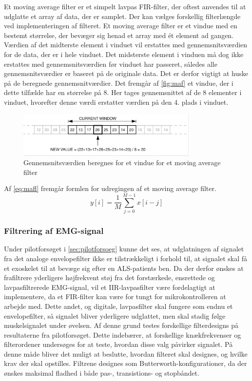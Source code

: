 \vspace{3mm}
\noindent
Et moving average filter er et simpelt lavpas FIR-filter, der oftest anvendes til at udglatte et array af data, der er samplet. Der kan vælges forskellig filterlængde ved implementeringen af filteret. Et moving average filter er et vindue med en bestemt størrelse, der bevæger sig henad et array med ét element ad gangen. Værdien af det midterste element i vinduet vil erstattes med gennemsnitsværdien for de data, der er i hele vinduet. Det midsterste element i vinduen må dog ikke erstattes med gennemsnitsværdien før vinduet har passeret, således alle gennemsnitsværdier er baseret på de originale data. Det er derfor vigtigt at huske på de beregnede gennemsnitværdier. Det fremgår af \autoref{fig:maf} et vindue, der i dette tilfælde har en størrelse på 8. Her tages gennemsnittet af de 8 elementer i vinduet, hvorefter denne værdi erstatter værdien på den 4. plads i vinduet.\citep{atmel2002}

\begin{figure} [H]
\centering
\includegraphics[width=0.8\textwidth]{figures/maf}
\caption{Gennemsnitsværdien beregnes for et vindue for et moving average filter}
\label{fig:maf}
\end{figure} 

Af \autoref{eq:mafl} fremgår formlen for udregingen af et moving average filter. 
\begin{equation}
y[i]=\dfrac{1}{M}\sum^{M-1}_{j=0} x[i-j]
\label{eq:mafl}
\end{equation}

\subsubsection{Filtrering af EMG-signal}
Under pilotforsøget i \autoref{sec:pilotforsoeg} kunne det ses, at udglatningen af signalet fra det analoge envelopefilter ikke er tilstrækkeligt i forhold til, at signalet skal få et exoskelet til at bevæge sig efter en ALS-patients ben. Da der derfor ønskes at frafiltrere yderligere højfrekvent støj fra det forstærkede, ensrettede og lavpasfiltrerede EMG-signal, vil et IIR-lavpasfilter være fordelagtigt at implementere, da et FIR-filter kan være for tungt for mikrokontrolleren at arbejde med. Dette andet, og digitale, lavpasfilter skal fungere som endnu et envelopefilter, så signalet bliver yderligere udglattet, men skal stadig følge muskelsignalet under øvelsen.
Af denne grund testes forskellige filterdesigns på resultaterne fra pilotforsøget. Dette indebærer, at forskellige knækfrekvenser og filterordener undersøges for at teste, hvordan disse valg påvirker signalet. På denne måde bliver det muligt at beslutte, hvordan filteret skal designes, og hvilke krav der skal opstilles. Filtrene designes som Butterworth-konfigurationer, da der ønskes maksimal fladhed i både pas-, transistions- og stopbåndet. 

